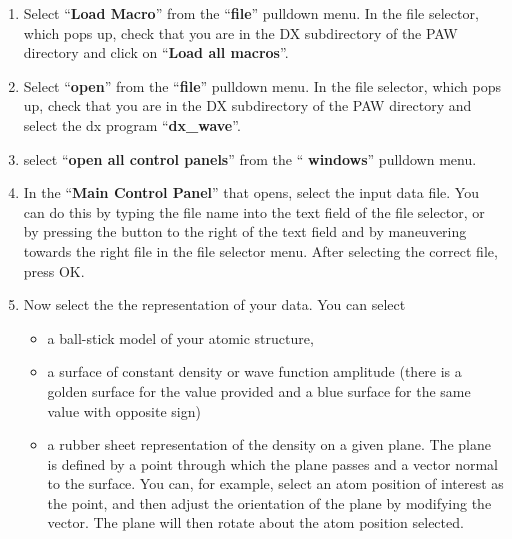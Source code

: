 \documentclass[final,12pt]{article}
\begin{document}
{{{{{{\bigskip{}\bigskip

\begin{enumerate}
\item Select ``{\bf Load Macro}'' from the ``{\bf file}'' pulldown
  menu. In the file selector, which pops up, check that you are in
  the DX subdirectory of the PAW directory and click on ``{\bf Load
    all macros}''.
\item Select ``{\bf open}'' from the ``{\bf file}'' pulldown menu. In the file
  selector, which pops up, check that you are in the DX subdirectory of the
  PAW directory and select the dx program ``{\bf dx\_wave}''.
\item select ``{\bf open all control panels}'' from the ``{\bf
    windows}'' pulldown menu.
\item In the ``{\bf Main Control Panel}'' that opens, select the input
  data file. You can do this by typing the file name into the text
  field of the file selector, or by pressing the button to the right of
  the text field and by maneuvering towards the right file in the
  file selector menu. After selecting the correct file, press OK.
\item Now select the the representation of your data. You can select 
\begin{itemize} 
\item a ball-stick model of your atomic structure,
\item a surface of constant density or wave function amplitude (there
  is a golden surface for the value provided and a blue surface for
  the same value with opposite sign)
\item a rubber sheet representation of the density on a given
  plane. The plane is defined by a point through which the plane
  passes and a vector normal to the surface. You can, for example,
  select an atom position of interest as the point, and then adjust
  the orientation of the plane by modifying the vector. The plane will
  then rotate about the atom position selected.



\end{itemize}
\end{enumerate}}}}}}}
\end{document}

